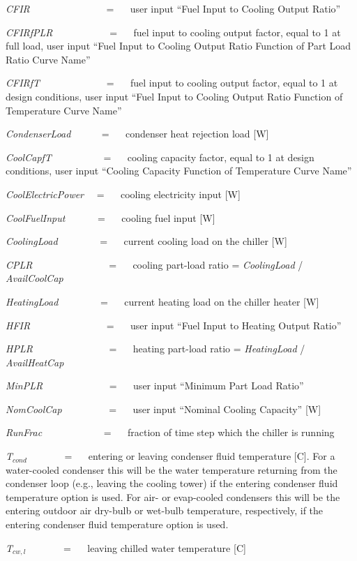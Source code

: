 \emph{CFIR}~~~~~~~~~~~~~~~ = ~~ user input ``Fuel Input to Cooling Output Ratio''

\emph{CFIRfPLR}~~~~~~~~~~~ = ~~ fuel input to cooling output factor, equal to 1 at full load, user input ``Fuel Input to Cooling Output Ratio Function of Part Load Ratio Curve Name''

\emph{CFIRfT}~~~~~~~~~~~~~ = ~~ fuel input to cooling output factor, equal to 1 at design conditions, user input ``Fuel Input to Cooling Output Ratio Function of Temperature Curve Name''

\emph{CondenserLoad} ~~~~~ = ~~ condenser heat rejection load {[}W{]}

\emph{CoolCapfT}~~~~~~~~~~ = ~~ cooling capacity factor, equal to 1 at design conditions, user input ``Cooling Capacity Function of Temperature Curve Name''

\emph{CoolElectricPower}~~ = ~~ cooling electricity input {[}W{]}

\emph{CoolFuelInput}~~~~~~ = ~~ cooling fuel input {[}W{]}

\emph{CoolingLoad}~~~~~~~~ = ~~ current cooling load on the chiller {[}W{]}

\emph{CPLR}~~~~~~~~~~~~~~~ = ~~ cooling part-load ratio = \emph{CoolingLoad} / \emph{AvailCoolCap}

\emph{HeatingLoad}~~~~~~~~ = ~~ current heating load on the chiller heater {[}W{]}

\emph{HFIR}~~~~~~~~~~~~~~~ = ~~ user input ``Fuel Input to Heating Output Ratio''

\emph{HPLR}~~~~~~~~~~~~~~~ = ~~ heating part-load ratio = \emph{HeatingLoad} / \emph{AvailHeatCap}

\emph{MinPLR}~~~~~~~~~~~~~ = ~~ user input ``Minimum Part Load Ratio''

\emph{NomCoolCap}~~~~~~~~~ = ~~ user input ``Nominal Cooling Capacity'' {[}W{]}

\emph{RunFrac}~~~~~~~~~~~~ = ~~ fraction of time step which the chiller is running

\emph{T\(_{cond}\)}~~~~~~~ = ~~ entering or leaving condenser fluid temperature {[}C{]}. For a water-cooled condenser this will be the water temperature returning from the condenser loop (e.g., leaving the cooling tower) if the entering condenser fluid temperature option is used. For air- or evap-cooled condensers this will be the entering outdoor air dry-bulb or wet-bulb temperature, respectively, if the entering condenser fluid temperature option is used.

\emph{T\(_{cw,l}\)}~~~~~~~ = ~~ leaving chilled water temperature {[}C{]}

